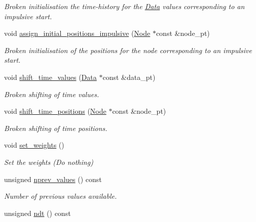 \begin{DoxyCompactItemize}
\begin{DoxyCompactList}\small\item\em Broken initialisation the time-\/history for the \hyperlink{classoomph_1_1Data}{Data} values corresponding to an impulsive start. \end{DoxyCompactList}\item 
void \hyperlink{classoomph_1_1ContinuationStorageScheme_a6d8eb64dca810444b461cd893ad7526c}{assign\+\_\+initial\+\_\+positions\+\_\+impulsive} (\hyperlink{classoomph_1_1Node}{Node} $\ast$const \&node\+\_\+pt)
\begin{DoxyCompactList}\small\item\em Broken initialisation of the positions for the node corresponding to an impulsive start. \end{DoxyCompactList}\item 
void \hyperlink{classoomph_1_1ContinuationStorageScheme_a74f8d1b2ca6413edfa6fe4a5110a215f}{shift\+\_\+time\+\_\+values} (\hyperlink{classoomph_1_1Data}{Data} $\ast$const \&data\+\_\+pt)
\begin{DoxyCompactList}\small\item\em Broken shifting of time values. \end{DoxyCompactList}\item 
void \hyperlink{classoomph_1_1ContinuationStorageScheme_a2271fd0ad65dda38686851df5a3970d5}{shift\+\_\+time\+\_\+positions} (\hyperlink{classoomph_1_1Node}{Node} $\ast$const \&node\+\_\+pt)
\begin{DoxyCompactList}\small\item\em Broken shifting of time positions. \end{DoxyCompactList}\item 
void \hyperlink{classoomph_1_1ContinuationStorageScheme_a57108416ef10b5d0a7664ea2d748a4cb}{set\+\_\+weights} ()
\begin{DoxyCompactList}\small\item\em Set the weights (Do nothing) \end{DoxyCompactList}\item 
unsigned \hyperlink{classoomph_1_1ContinuationStorageScheme_a895e0f4bc35dc3cae52fcee71db86de3}{nprev\+\_\+values} () const
\begin{DoxyCompactList}\small\item\em Number of previous values available. \end{DoxyCompactList}\item 
unsigned \hyperlink{classoomph_1_1ContinuationStorageScheme_aedf54b092d3f98b60b49190cb5dad540}{ndt} () const

\end{DoxyCompactItemize}
